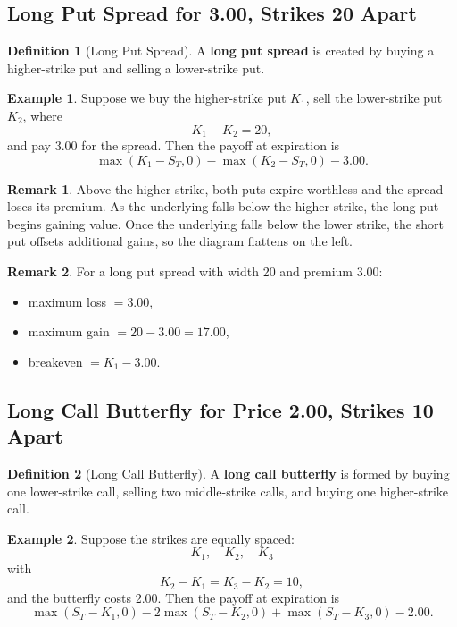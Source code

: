 \documentclass[11pt]{article}
\theoremstyle{definition}
\newtheorem{definition}{Definition}[section]
\newtheorem{example}{Example}[section]
\newtheorem{remark}{Remark}[section]
\begin{document}
\subsection{Long Put Spread for 3.00, Strikes 20 Apart}

\begin{definition}[Long Put Spread]
A \textbf{long put spread} is created by buying a higher-strike put and selling a lower-strike put.
\end{definition}

\begin{example}
Suppose we buy the higher-strike put \(K_1\), sell the lower-strike put \(K_2\), where
\[
K_1-K_2=20,
\]
and pay 3.00 for the spread. Then the payoff at expiration is
\[
\max(K_1-S_T,0)-\max(K_2-S_T,0)-3.00.
\]
\end{example}

\begin{remark}
Above the higher strike, both puts expire worthless and the spread loses its premium. As the underlying falls below the higher strike, the long put begins gaining value. Once the underlying falls below the lower strike, the short put offsets additional gains, so the diagram flattens on the left.
\end{remark}

\begin{remark}
For a long put spread with width 20 and premium 3.00:
\begin{itemize}[leftmargin=2em]
    \item maximum loss \(= 3.00\),
    \item maximum gain \(= 20 - 3.00 = 17.00\),
    \item breakeven \(= K_1 - 3.00\).
\end{itemize}
\end{remark}

\subsection{Long Call Butterfly for Price 2.00, Strikes 10 Apart}

\begin{definition}[Long Call Butterfly]
A \textbf{long call butterfly} is formed by buying one lower-strike call, selling two middle-strike calls, and buying one higher-strike call.
\end{definition}

\begin{example}
Suppose the strikes are equally spaced:
\[
K_1,\quad K_2,\quad K_3
\]
with
\[
K_2-K_1 = K_3-K_2 = 10,
\]
and the butterfly costs 2.00. Then the payoff at expiration is
\[
\max(S_T-K_1,0) - 2\max(S_T-K_2,0) + \max(S_T-K_3,0) - 2.00.
\]
\end{example}
\end{document}
